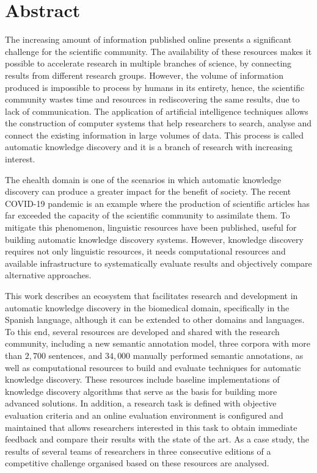 \chapter*{Abstract}

The increasing amount of information published online presents a significant challenge for the scientific community. The availability of these resources makes it possible to accelerate research in multiple branches of science, by connecting results from different research groups. However, the volume of information produced is impossible to process by humans in its entirety, hence, the scientific community wastes time and resources in rediscovering the same results, due to lack of communication. The application of artificial intelligence techniques allows the construction of computer systems that help researchers to search, analyse and connect the existing information in large volumes of data. This process is called automatic knowledge discovery and it is a branch of research with increasing interest.

The ehealth domain is one of the scenarios in which automatic knowledge discovery can produce a greater impact for the benefit of society. The recent COVID-19 pandemic is an example where the production of scientific articles has far exceeded the capacity of the scientific community to assimilate them. To mitigate this phenomenon, linguistic resources have been published, useful for building automatic knowledge discovery systems.
However, knowledge discovery requires not only linguistic resources, it needs computational resources and available infrastructure to systematically evaluate results and objectively compare alternative approaches.

This work describes an ecosystem that facilitates research and development in automatic knowledge discovery in the biomedical domain, specifically in the Spanish language, although it can be extended to other domains and languages. To this end, several resources are developed and shared with the research community, including a new semantic annotation model, three corpora with more than $2,700$ sentences, and $34,000$ manually performed semantic annotations, as well as computational resources to build and evaluate techniques for automatic knowledge discovery.
These resources include baseline implementations of knowledge discovery algorithms that serve as the basis for building more advanced solutions.
In addition, a research task is defined with objective evaluation criteria and an online evaluation environment is configured and maintained that allows researchers interested in this task to obtain immediate feedback and compare their results with the state of the art.
As a case study, the results of several teams of researchers in three consecutive editions of a competitive challenge organised based on these resources are analysed.

